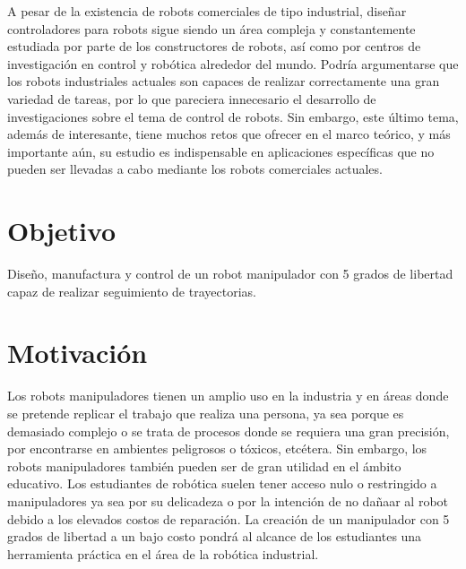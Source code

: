 A pesar de la existencia de robots comerciales de tipo industrial, diseñar controladores para robots sigue siendo un área compleja y constantemente estudiada por parte de los constructores de robots, así como por centros de investigación en control y robótica alrededor del mundo. Podría argumentarse que los robots industriales actuales son capaces de realizar correctamente una gran variedad de tareas, por lo que pareciera innecesario el desarrollo de investigaciones sobre el tema de control de robots. Sin embargo, este último tema, además de interesante, tiene muchos retos que ofrecer en el marco teórico, y más importante aún, su estudio es indispensable en aplicaciones específicas que no pueden ser llevadas a cabo mediante los robots comerciales actuales.


\section{Objetivo}

Diseño, manufactura y control de un robot manipulador con 5 grados de libertad capaz de realizar seguimiento de trayectorias.
\newpage

\section{Motivación}

Los robots manipuladores tienen un amplio uso en la industria y en áreas donde se pretende replicar el trabajo que realiza una persona, ya sea porque es demasiado complejo o se trata de procesos donde se requiera una gran precisión, por encontrarse en ambientes peligrosos o tóxicos, etcétera. Sin embargo, los robots manipuladores también pueden ser de gran utilidad en el ámbito educativo. Los estudiantes de robótica suelen tener acceso nulo o restringido a manipuladores ya sea por su delicadeza o por la intención de no dañaar al robot debido a los elevados costos de reparación. La creación de un manipulador con 5 grados de libertad a un bajo costo pondrá al alcance de los estudiantes una herramienta práctica en el área de la robótica industrial.
 
